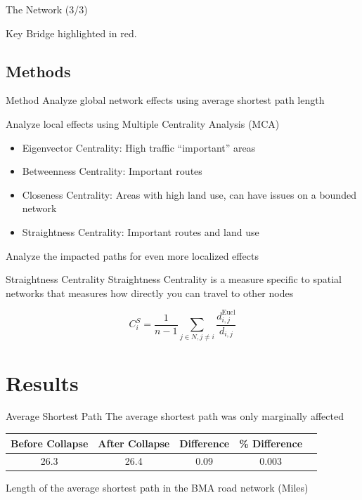 \documentclass{beamer}
\numberwithin{figure}{section} %
\numberwithin{table}{section} %
\begin{document}
\begin{frame}{The Network (3/3)}
    \begin{center}
    {\footnotesize Key Bridge highlighted in red.}
    \end{center}
\end{frame}

\subsection{Methods}

\begin{frame}{Method}
    Analyze global network effects using average shortest path length

    Analyze local effects using Multiple Centrality Analysis (MCA) {\tiny \parencites{Porta06}{Porta07}{Barthelemy09}{Jayaweera17}}
    \begin{itemize}
        \item Eigenvector Centrality: High traffic ``important'' areas
        \item Betweenness Centrality: Important routes
        \item Closeness Centrality: Areas with high land use, can have issues on a bounded network
        \item Straightness Centrality: Important routes and land use
    \end{itemize}

   Analyze the impacted paths for even more localized effects
\end{frame}

\begin{frame}{Straightness Centrality}
    Straightness Centrality is a measure specific to spatial networks that measures how directly you can travel to other nodes

    \begin{equation*}
        C_i^S = \frac{1}{n-1} \sum_{j \in N, j \neq i} \frac{d_{i, j}^\text{Eucl}}{d_{i, j}}
    \end{equation*}
\end{frame}


\section{Results}

\begin{frame}{Average Shortest Path}
    The average shortest path was only marginally affected
    
    \begin{table}
        \centering
        \begin{tabular}{ccccc}
            \toprule
            \textbf{Before Collapse} & \textbf{After Collapse} & \textbf{Difference} & \textbf{\% Difference} \\
            \midrule
            26.3 & 26.4 & 0.09 & 0.003 \\
            \bottomrule
        \end{tabular}
        {\scriptsize Length of the average shortest path in the BMA road network (Miles)}
    \end{table}
\end{frame}
\end{document}
